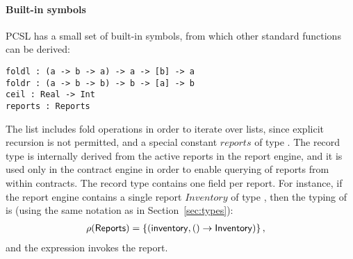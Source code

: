 \paragraph{Built-in symbols}
PCSL has a small set of built-in symbols, from which other standard
functions can be derived:
\begin{lstlisting}[language=pcsl,basicstyle=\normalsize]
foldl : (a -> b -> a) -> a -> [b] -> a
foldr : (a -> b -> b) -> b -> [a] -> b
ceil : Real -> Int
reports : Reports
\end{lstlisting}
The list includes fold operations in order to iterate over lists,
since explicit recursion is not permitted, and a special constant
$\mathit{reports}$ of type . The
record type  is internally derived from the active
reports in the report engine, and it is used only in the contract
engine in order to enable querying of reports from within
contracts. The record type contains one field per report. For
instance, if the report engine contains a single report
$\mathit{Inventory}$ of type , then the typing
of  is (using the same notation as in
Section~\ref{sec:types}):
\begin{align*}
\rho(\mathsf{Reports}) &= \left\{(\mathsf{inventory},() \to
  \mathsf{Inventory})\right\},
\end{align*}
and the expression  invokes the report.

